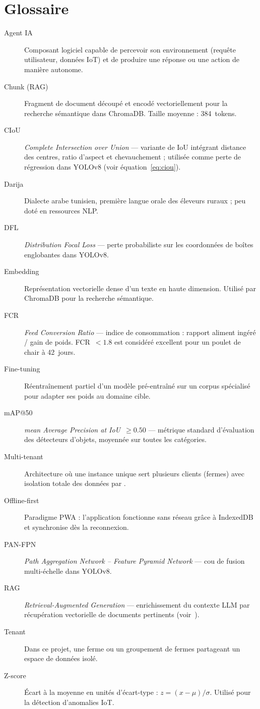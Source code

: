 
\chapter*{Glossaire}

\begin{description}
  \item[Agent IA] Composant logiciel capable de percevoir son environnement
    (requête utilisateur, données IoT) et de produire une réponse ou une
    action de manière autonome.
  \item[Chunk (RAG)] Fragment de document découpé et encodé vectoriellement
    pour la recherche sémantique dans ChromaDB. Taille moyenne : 384~tokens.
  \item[CIoU] \textit{Complete Intersection over Union} — variante de IoU
    intégrant distance des centres, ratio d'aspect et chevauchement ;
    utilisée comme perte de régression dans YOLOv8 (voir équation~\ref{eq:ciou}).
  \item[Darija] Dialecte arabe tunisien, première langue orale des éleveurs
    ruraux ; peu doté en ressources NLP.
  \item[DFL] \textit{Distribution Focal Loss} — perte probabiliste sur les
    coordonnées de boîtes englobantes dans YOLOv8.
  \item[Embedding] Représentation vectorielle dense d'un texte en haute
    dimension. Utilisé par ChromaDB pour la recherche sémantique.
  \item[FCR] \textit{Feed Conversion Ratio} — indice de consommation :
    rapport aliment ingéré / gain de poids. FCR~$< 1.8$ est considéré
    excellent pour un poulet de chair à 42~jours.
  \item[Fine-tuning] Réentraînement partiel d'un modèle pré-entraîné sur
    un corpus spécialisé pour adapter ses poids au domaine cible.
  \item[mAP@50] \textit{mean Average Precision at IoU~$\geq 0.50$} —
    métrique standard d'évaluation des détecteurs d'objets, moyennée sur
    toutes les catégories.
  \item[Multi-tenant] Architecture où une instance unique sert plusieurs
    clients (fermes) avec isolation totale des données par .
  \item[Offline-first] Paradigme PWA : l'application fonctionne sans
    réseau grâce à IndexedDB et synchronise dès la reconnexion.
  \item[PAN-FPN] \textit{Path Aggregation Network -- Feature Pyramid
    Network} — cou de fusion multi-échelle dans YOLOv8.
  \item[RAG] \textit{Retrieval-Augmented Generation} — enrichissement du
    contexte LLM par récupération vectorielle de documents pertinents
    (voir~\cite{lewis2020rag}).
  \item[Tenant] Dans ce projet, une ferme ou un groupement de fermes
    partageant un espace de données isolé.
  \item[Z-score] Écart à la moyenne en unités d'écart-type :
    $z = (x-\mu)/\sigma$. Utilisé pour la détection d'anomalies IoT.
\end{description}
